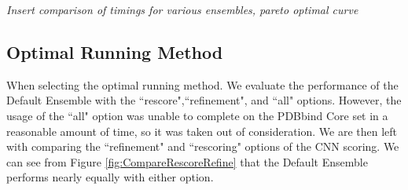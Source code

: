 \documentclass[journal=jcisd8,manuscript=article]{achemso}
\begin{document}
\textit{Insert comparison of timings for various ensembles, pareto optimal curve}

\subsection{Optimal Running Method}
When selecting the optimal running method. We evaluate the performance of the Default Ensemble with the ``rescore",``refinement", and ``all" options. However, the usage of the ``all" option was unable to complete on the PDBbind Core set in a reasonable amount of time, so it was taken out of consideration. We are then left with comparing the ``refinement" and ``rescoring" options of the CNN scoring. We can see from Figure \ref{fig:CompareRescoreRefine} that the Default Ensemble performs nearly equally with either option.
\end{document}
